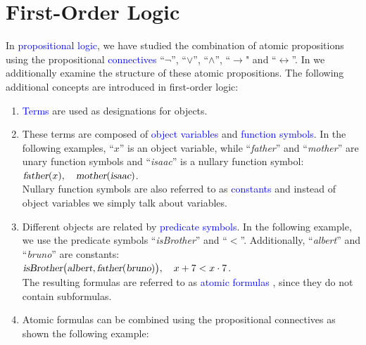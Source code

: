\chapter{First-Order Logic}
In \textcolor{blue}{propositional logic}, we have studied the combination of atomic propositions using
the propositional \textcolor{blue}{connectives} ``$\neg$'', ``$\vee$'', ``$\wedge$'', ``$\rightarrow$" and
``$\leftrightarrow$''.  In  we additionally 
examine the structure of these atomic propositions. The following additional concepts are introduced in
first-order logic: 
\begin{enumerate}
\item \textcolor{blue}{Terms} are used as designations for objects.
\item These terms are composed of \textcolor{blue}{object variables} and \textcolor{blue}{function symbols}.
      In the following examples, ``$x$'' is an object variable, while
      ``\textsl{father}'' and ``\textsl{mother}'' are unary function symbols and
      ``\textsl{isaac}'' is a nullary function symbol:
      \\[0.2cm]
      \hspace*{1.3cm}
      $\textsl{father}(x),\quad \textsl{mother}(\textsl{isaac})$.
      \\[0.2cm]
      Nullary function symbols are also referred to as \textcolor{blue}{constants}
      and instead of object variables we simply talk about variables.
\item Different objects are related by \textcolor{blue}{predicate symbols}.
      In the following example, we use the predicate symbols ``\textsl{isBrother}'' and ``$<$''.
      Additionally, ``\textsl{albert}'' and ``\textsl{bruno}'' are constants:
      \\[0.2cm]
      \hspace*{1.3cm}
      $\textsl{isBrother}\bigl(\textsl{albert}, \textsl{father}(\textsl{bruno})\bigr),\quad x+7 < x\cdot 7$.
      \\[0.2cm]
      The resulting formulas are referred to as \textcolor{blue}{atomic formulas} ,
      since they do not contain subformulas. 
\item Atomic formulas can be combined using the propositional connectives as shown the following example:
      \\[0.2cm]
      \hspace*{1.3cm}

\end{enumerate}
